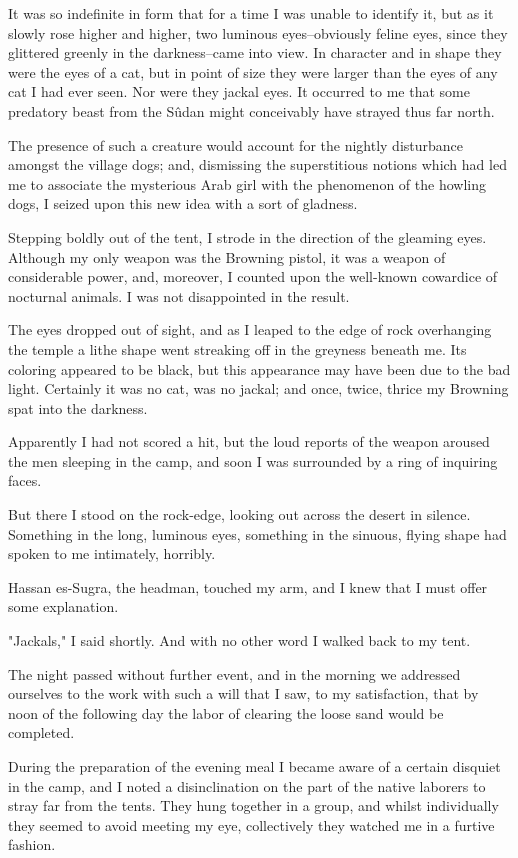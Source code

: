 It was so indefinite in form that for a time I was unable to identify
it, but as it slowly rose higher and higher, two luminous
eyes--obviously feline eyes, since they glittered greenly in the
darkness--came into view. In character and in shape they were the eyes
of a cat, but in point of size they were larger than the eyes of any
cat I had ever seen. Nor were they jackal eyes. It occurred to me that
some predatory beast from the Sûdan might conceivably have strayed
thus far north.

The presence of such a creature would account for the nightly
disturbance amongst the village dogs; and, dismissing the
superstitious notions which had led me to associate the mysterious
Arab girl with the phenomenon of the howling dogs, I seized upon this
new idea with a sort of gladness.

Stepping boldly out of the tent, I strode in the direction of the
gleaming eyes. Although my only weapon was the Browning pistol, it was
a weapon of considerable power, and, moreover, I counted upon the
well-known cowardice of nocturnal animals. I was not disappointed in
the result.

The eyes dropped out of sight, and as I leaped to the edge of rock
overhanging the temple a lithe shape went streaking off in the
greyness beneath me. Its coloring appeared to be black, but this
appearance may have been due to the bad light. Certainly it was no
cat, was no jackal; and once, twice, thrice my Browning spat into the
darkness.

Apparently I had not scored a hit, but the loud reports of the weapon
aroused the men sleeping in the camp, and soon I was surrounded by a
ring of inquiring faces.

But there I stood on the rock-edge, looking out across the desert in
silence. Something in the long, luminous eyes, something in the
sinuous, flying shape had spoken to me intimately, horribly.

Hassan es-Sugra, the headman, touched my arm, and I knew that I must
offer some explanation.

"Jackals," I said shortly. And with no other word I walked back to my
tent.

The night passed without further event, and in the morning we
addressed ourselves to the work with such a will that I saw, to my
satisfaction, that by noon of the following day the labor of clearing
the loose sand would be completed.

During the preparation of the evening meal I became aware of a certain
disquiet in the camp, and I noted a disinclination on the part of the
native laborers to stray far from the tents. They hung together in a
group, and whilst individually they seemed to avoid meeting my eye,
collectively they watched me in a furtive fashion.

